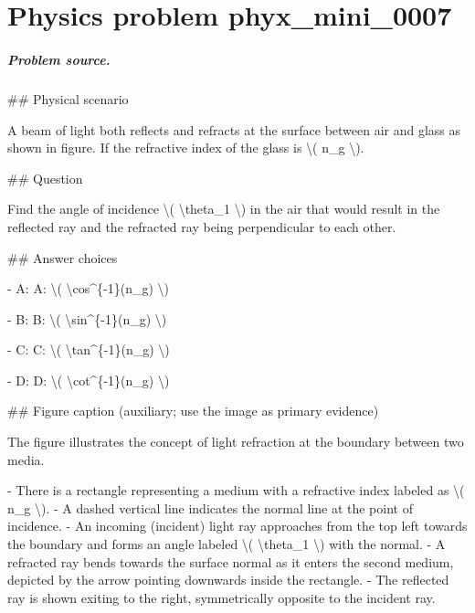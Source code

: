
\chapter{Physics problem phyx\_mini\_0007}
\label{ch:PhyXMiniProblems_problem_phyx_mini_0007}

\paragraph{Problem source.}
\#\# Physical scenario

A beam of light both reflects and refracts at the surface between air and glass as shown in figure. If the refractive index of the glass is \textbackslash{}( n\_g \textbackslash{}).

\#\# Question

Find the angle of incidence \textbackslash{}( \textbackslash{}theta\_1 \textbackslash{}) in the air that would result in the reflected ray and the refracted ray being perpendicular to each other.

\#\# Answer choices

- A: A: \textbackslash{}( \textbackslash{}cos\textasciicircum{}\{-1\}(n\_g) \textbackslash{})

- B: B: \textbackslash{}( \textbackslash{}sin\textasciicircum{}\{-1\}(n\_g) \textbackslash{})

- C: C: \textbackslash{}( \textbackslash{}tan\textasciicircum{}\{-1\}(n\_g) \textbackslash{})

- D: D: \textbackslash{}( \textbackslash{}cot\textasciicircum{}\{-1\}(n\_g) \textbackslash{})

\#\# Figure caption (auxiliary; use the image as primary evidence)

The figure illustrates the concept of light refraction at the boundary between two media. 

- There is a rectangle representing a medium with a refractive index labeled as \textbackslash{}( n\_g \textbackslash{}).
- A dashed vertical line indicates the normal line at the point of incidence.
- An incoming (incident) light ray approaches from the top left towards the boundary and forms an angle labeled \textbackslash{}( \textbackslash{}theta\_1 \textbackslash{}) with the normal.
- A refracted ray bends towards the surface normal as it enters the second medium, depicted by the arrow pointing downwards inside the rectangle.
- The reflected ray is shown exiting to the right, symmetrically opposite to the incident ray.
  
